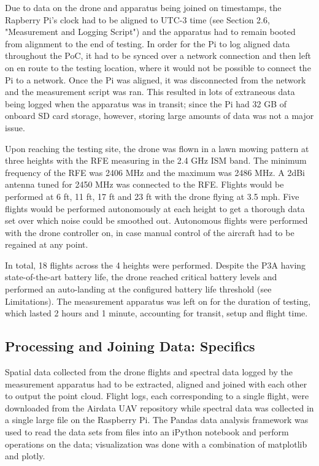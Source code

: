 \documentclass[pageno]{jpaper}
\begin{document}
Due to data on the drone and apparatus being joined on timestamps, the Rapberry Pi's clock had to be aligned to UTC-3 time (see Section 2.6,  "Measurement and Logging Script") and the apparatus had to remain booted from alignment to the end of testing. In order for the Pi to log aligned data throughout the PoC, it had to be synced over a network connection and then left on en route to the testing location, where it would not be possible to connect the Pi to a network. Once the Pi was aligned, it was disconnected from the network and the measurement script was ran. This resulted in lots of extraneous data being logged when the apparatus was in transit; since the Pi had 32 GB of onboard SD card storage, however, storing large amounts of data was not a major issue. 

Upon reaching the testing site, the drone was flown in a lawn mowing pattern at three heights with the RFE measuring in the 2.4 GHz ISM band. The minimum frequency of the RFE was 2406 MHz and the maximum was 2486 MHz. A 2dBi antenna tuned for 2450 MHz was connected to the RFE. Flights would be performed at 6 ft, 11 ft, 17 ft and 23 ft with the drone flying at 3.5 mph. Five flights would be performed autonomously at each height to get a thorough data set over which noise could be smoothed out. Autonomous flights were performed with the drone controller on, in case manual control of the aircraft had to be regained at any point.

In total, 18 flights across the 4 heights were performed. Despite the P3A having state-of-the-art battery life, the drone reached critical battery levels and performed an auto-landing at the configured battery life threshold (see Limitations). The measurement apparatus was left on for the duration of testing, which lasted 2 hours and 1 minute, accounting for transit, setup and flight time. 

\subsection{Processing and Joining Data: Specifics}

Spatial data collected from the drone flights and spectral data logged by the measurement apparatus had to be extracted, aligned and joined with each other to output the point cloud. Flight logs, each corresponding to a single flight, were downloaded from the Airdata UAV repository while spectral data was collected in a single large file on the Raspberry Pi. The Pandas data analysis framework was used to read the data sets from files into an iPython notebook and perform operations on the data; visualization was done with a combination of matplotlib and plotly.
\end{document}
